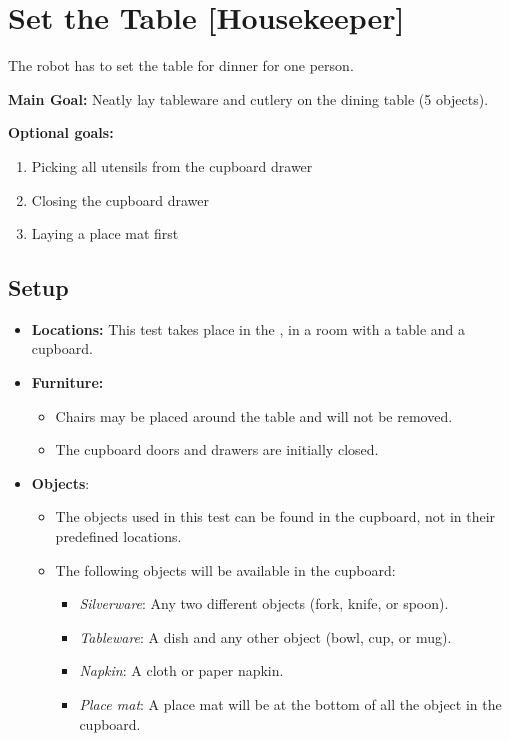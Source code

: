 \section{Set the Table [Housekeeper]}
\label{test:set-the-table}
The robot has to set the table for dinner for one person.


\noindent \textbf{Main Goal:} Neatly lay tableware and cutlery on the dining table (5 objects).

\noindent \textbf{Optional goals:}
\begin{enumerate}[nosep]
	\item Picking all utensils from the cupboard drawer
	\item Closing the cupboard drawer
	\item Laying a place mat first
\end{enumerate}


\subsection*{Setup}
\begin{itemize}[nosep]
	\item \textbf{Locations:} This test takes place in the \Arena{}, in a room with a table and a cupboard.
	\item \textbf{Furniture:}
		\begin{itemize}
		 \item Chairs may be placed around the table and will not be removed.
		 \item The cupboard doors and drawers are initially closed.
		\end{itemize}
	\item \textbf{Objects}: 
	\begin{itemize}
		 \item 	The objects used in this test can be found in the cupboard, not in their predefined locations.
		 \item The following objects will be available in the cupboard:
		 \begin{itemize}
			\item\textit{Silverware}: Any two different objects (fork, knife, or spoon).
			\item\textit{Tableware}: A dish and any other object (bowl, cup, or mug).
			\item\textit{Napkin}: A cloth or paper napkin.
			\item\textit{Place mat}: A place mat will be at the bottom of all the object in the cupboard.
		 \end{itemize}
		 
		\end{itemize}
\end{itemize}

